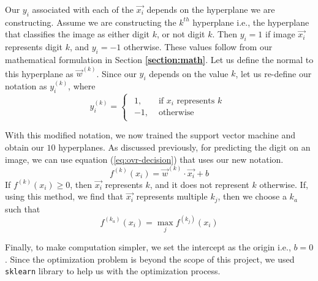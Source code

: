 Our ${y_i}$ associated with each of the $\vec{x_i}$ depends on the hyperplane we are constructing. Assume we are constructing the $k^{th}$ hyperplane i.e., the hyperplane that classifies the image as either digit $k$, or not digit $k$. Then $y_i = 1$ if image $\vec{x_i}$ represents digit $k$, and $y_i = -1$ otherwise. These values follow from our mathematical formulation in Section \textbf{\ref{section:math}}. Let us define the normal to this hyperplane as $\vec{w}^{(k)}$. Since our $y_i$ depends on the value $k$, let us re-define our notation as $y^{(k)}_i$, where
\begin{equation*}
    y^{(k)}_i= 
\begin{cases}
\begin{aligned}
 1,& \text{ if } x_i \text{ represents } k\\
-1,              & \text{ otherwise}
\end{aligned}
\end{cases}
\end{equation*}

With this modified notation, we now trained the support vector machine and obtain our $10$ hyperplanes. As discussed previously, for predicting the digit on an image, we can use equation (\ref{eq:ovr-decision}) that uses our new notation.
\begin{equation}
	f^{(k)}(x_i) = \vec{w}^{(k)}\cdot\vec{x_i} + b \label{eq:ovr-decision}
\end{equation}
If $f^{(k)}(x_i) \geq 0$, then $\vec{x_i}$ represents $k$, and it does not represent $k$ otherwise. If, using this method, we find that $\vec{x_i}$ represents multiple $k_j$, then we choose a $k_a$ such that
\begin{equation*}
	f^{(k_a)}(x_i) = \max_{j} f^{(k_j)}(x_i)  \label{eq:ovr-conflict}
\end{equation*}

Finally, to make computation simpler, we set the intercept as the origin i.e., $b = 0$. Since the optimization problem is beyond the scope of this project, we used \texttt{sklearn}\cite{scikit-learn} library to help us with the optimization process.